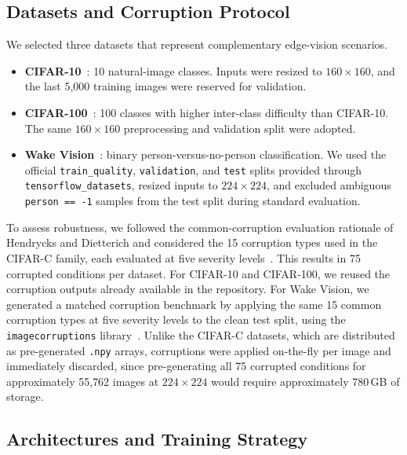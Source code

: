 \documentclass[runningheads]{llncs}
\begin{document}
\subsection{Datasets and Corruption Protocol}
We selected three datasets that represent complementary edge-vision scenarios.
\begin{itemize}
    \item \textbf{CIFAR-10}~\cite{krizhevsky2009cifar}: 10 natural-image
    classes. Inputs were resized to $160\times160$, and the last 5,000
    training images were reserved for validation.

    \item \textbf{CIFAR-100}~\cite{krizhevsky2009cifar}: 100 classes with
    higher inter-class difficulty than CIFAR-10. The same $160\times160$
    preprocessing and validation split were adopted.

    \item \textbf{Wake Vision}~\cite{banbury2024wakevision}: binary
    person-versus-no-person classification. We used the official
    \texttt{train\_quality}, \texttt{validation}, and \texttt{test} splits
    provided through \texttt{tensorflow\_datasets}, resized inputs to
    $224\times224$, and excluded ambiguous \texttt{person == -1} samples from
    the test split during standard evaluation.
\end{itemize}

To assess robustness, we followed the common-corruption evaluation rationale
of Hendrycks and Dietterich and considered the 15 corruption types used in the
CIFAR-C family, each evaluated at five severity
levels~\cite{hendrycks2019benchmarking}. This results in 75 corrupted
conditions per dataset. For CIFAR-10 and CIFAR-100, we reused the corruption
outputs already available in the repository. For Wake Vision, we generated a
matched corruption benchmark by applying the same 15 common corruption types at
five severity levels to the clean test split, using the
\texttt{imagecorruptions} library~\cite{michaelis2019imagecorruptions}. Unlike
the CIFAR-C datasets, which are distributed as pre-generated \texttt{.npy}
arrays, corruptions were applied on-the-fly per image and immediately
discarded, since pre-generating all 75 corrupted conditions for approximately
55{,}762 images at $224\times224$ would require approximately 780\,GB of
storage.

\subsection{Architectures and Training Strategy}
\end{document}
